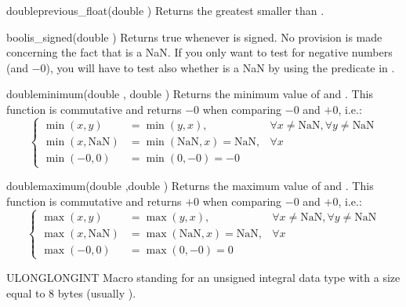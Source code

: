 \documentclass{manual}
\begin{document}
\begin{deffun}{double}{previous\_float}{(double )}
  Returns the greatest  smaller than .
\end{deffun}

\begin{deffun}{bool}{is\_signed}{(double )}
Returns true whenever  is signed. No provision is made concerning the
fact that  is a NaN. If you only want to test for negative
numbers (and $-0$), you will have to test also whether  is a NaN
by using the  predicate in .
\end{deffun}

\begin{deffun}{double}{minimum}{(double , double )}
  Returns the minimum  value of 
  and . This function is commutative and returns $-0$ when comparing
  $-0$ and $+0$, i.e.:
\begin{equation*}
\left\{\begin{array}{lll}
    \min(x,y) &=\min(y,x), &\forall x\neq\text{NaN}, \forall y\neq\text{NaN}\\
    \min(x,\text{NaN}) &=\min(\text{NaN},x)=\text{NaN}, &\forall x\\
    \min(-0,0) &=\min(0,-0)=-0
  \end{array}\right.
\end{equation*}
\end{deffun}

\begin{deffun}{double}{maximum}{(double ,double )}
  Returns the maximum  value of 
  and . This function is commutative and returns $+0$ when comparing
  $-0$ and $+0$, i.e.:
\begin{equation*}
  \left\{\begin{array}{lll}
      \max(x,y) &= \max(y,x), &\forall x\neq\text{NaN}, \forall y\neq\text{NaN} \\
      \max(x,\text{NaN})&=\max(\text{NaN},x)=\text{NaN}, &\forall x\\
      \max(-0,0)&=\max(0,-0)=0
    \end{array}\right.
\end{equation*}
\end{deffun}

\begin{defmacro}{ULONGLONGINT}
  Macro standing for an unsigned integral data type with a size equal to 8 bytes
  (usually ).
\end{defmacro}
\end{document}
